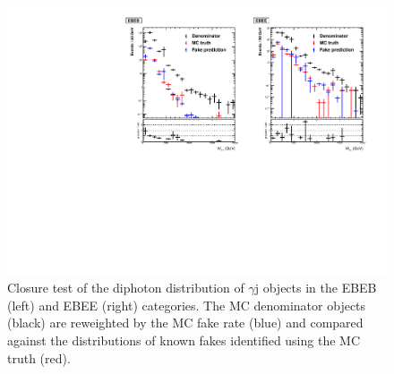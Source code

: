 \begin{figure}[!htbp]
  \centering
  \includegraphics[scale=0.70]{figures/closure_test_diphoton_kinematics_gjets_all.pdf}
  \caption{Closure test of the diphoton \Mgg distribution of $\gamma$j objects in the EBEB (left) and EBEE (right) categories. The MC denominator objects (black) are reweighted by the MC fake rate (blue) and compared against the distributions of known fakes identified using the MC truth (red).}
  \label{fig:closure_test_diphoton_kinematics_gjets}
\end{figure}

